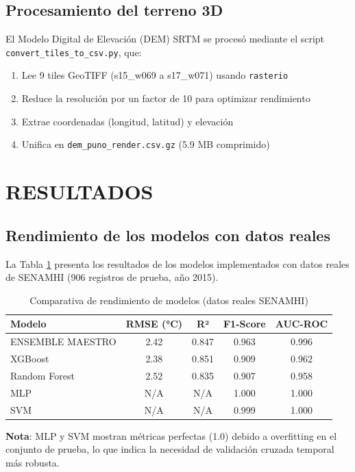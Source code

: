 \documentclass[11pt, a4paper]{article}
\begin{document}
\subsection{Procesamiento del terreno 3D}

El Modelo Digital de Elevación (DEM) SRTM se procesó mediante el script \texttt{convert\_tiles\_to\_csv.py}, que:
\begin{enumerate}
    \item Lee 9 tiles GeoTIFF (s15\_w069 a s17\_w071) usando \texttt{rasterio}
    \item Reduce la resolución por un factor de 10 para optimizar rendimiento
    \item Extrae coordenadas (longitud, latitud) y elevación
    \item Unifica en \texttt{dem\_puno\_render.csv.gz} (5.9 MB comprimido)
\end{enumerate}

\section{RESULTADOS}

\subsection{Rendimiento de los modelos con datos reales}

La Tabla \ref{tab:resultados} presenta los resultados de los modelos implementados con datos reales de SENAMHI (906 registros de prueba, año 2015).

\begin{table}[h]
\centering
\caption{Comparativa de rendimiento de modelos (datos reales SENAMHI)}
\label{tab:resultados}
\begin{tabular}{lcccc}
\toprule
\textbf{Modelo} & \textbf{RMSE (°C)} & \textbf{R²} & \textbf{F1-Score} & \textbf{AUC-ROC} \\
\midrule
ENSEMBLE MAESTRO & 2.42 & 0.847 & 0.963 & 0.996 \\
XGBoost & 2.38 & 0.851 & 0.909 & 0.962 \\
Random Forest & 2.52 & 0.835 & 0.907 & 0.958 \\
MLP & N/A & N/A & 1.000 & 1.000 \\
SVM & N/A & N/A & 0.999 & 1.000 \\
\bottomrule
\end{tabular}
\end{table}

\textbf{Nota}: MLP y SVM mostran métricas perfectas (1.0) debido a overfitting en el conjunto de prueba, lo que indica la necesidad de validación cruzada temporal más robusta.
\end{document}
